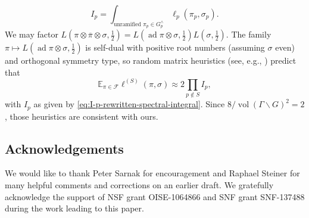 \documentclass[reqno,10pt]{amsart}
\theoremstyle{plain} %
\theoremstyle{definition}
\theoremstyle{plain} %
\theoremstyle{remark}
\theoremstyle{itplain} %
\theoremstyle{remark} %
\numberwithin{equation}{section}
\DeclareMathOperator{\ad}{ad}
\DeclareMathOperator{\vol}{vol}
\begin{document}
\begin{equation}\label{eq:I-p-rewritten-spectral-integral}
  I_p =  \int_{\text{unramified }\pi_p \in G_p^\wedge}
  \ell_p(\pi_p,\sigma_p).
\end{equation}
We may factor $L(\pi \otimes \overline{\pi } \otimes \sigma, \tfrac{1}{2}) = L(\ad \pi \otimes \sigma, \tfrac{1}{2}) L(\sigma, \tfrac{1}{2})$.  The family $\pi \mapsto L(\ad \pi \otimes \sigma,\tfrac{1}{2} )$ is self-dual with positive root numbers (assuming $\sigma$ even) and orthogonal symmetry type, so random matrix heuristics (see, e.g., \cite[\S1.2]{nelson-venkatesh-1}) predict that
\[
  \mathbb{E}_{\pi \in \mathcal{F}} \ell^{(S)}(\pi,\sigma) \approx 2 \prod_{p \notin S} I_p,
\]
with $I_p$ as given by \eqref{eq:I-p-rewritten-spectral-integral}.  Since $8/\vol(\Gamma \backslash G)^2 = 2$, those heuristics are consistent with ours.

\subsection*{Acknowledgements}
We would like to thank Peter Sarnak for encouragement and Raphael Steiner for many helpful comments and corrections on an earlier draft.  We gratefully acknowledge the support of NSF grant OISE-1064866 and SNF grant SNF-137488 during the work leading to this paper.






\end{document}
